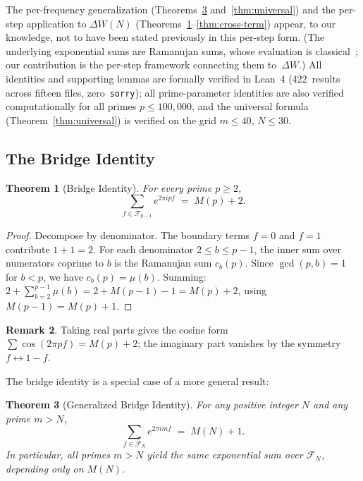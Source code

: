\documentclass[11pt]{article}
\newtheorem{theorem}{Theorem}[section]
\theoremstyle{definition}
\newtheorem{remark}[theorem]{Remark}
\newcommand{\F}{\mathcal{F}}
\begin{document}
The per-frequency generalization (Theorems~\ref{thm:gen-bridge}
and~\ref{thm:universal}) and the per-step application to
$\Delta W(N)$ (Theorems~\ref{thm:bridge}--\ref{thm:cross-term})
appear, to our knowledge, not to have been stated previously
in this per-step form.  (The underlying exponential sums are
Ramanujan sums, whose evaluation is classical~\cite{Ramanujan1918};
our contribution is the per-step framework connecting them
to~$\Delta W$.)  All identities and supporting lemmas are
formally verified in Lean~4 (422~results across fifteen files,
zero~\texttt{sorry}); all prime-parameter identities
are also verified
computationally for all primes $p \le 100{,}000$, and the universal
formula (Theorem~\ref{thm:universal}) is verified on the grid
$m \le 40$, $N \le 30$.

\subsection{The Bridge Identity}

\begin{theorem}[Bridge Identity]\label{thm:bridge}
For every prime $p \ge 2$,
\begin{equation}
  \sum_{f \in \F_{p-1}} e^{2\pi i p f}
  \;=\; M(p) + 2.
\end{equation}
\end{theorem}

\begin{proof}
Decompose by denominator.  The boundary terms $f = 0$ and $f = 1$
contribute $1 + 1 = 2$.  For each denominator $2 \le b \le p-1$,
the inner sum over numerators coprime to $b$ is the Ramanujan sum
$c_b(p)$.  Since $\gcd(p, b) = 1$ for $b < p$, we have
$c_b(p) = \mu(b)$.  Summing: $2 + \sum_{b=2}^{p-1} \mu(b) =
2 + M(p-1) - 1 = M(p) + 2$, using $M(p-1) = M(p) + 1$.
\end{proof}

\begin{remark}
Taking real parts gives the cosine form
$\sum \cos(2\pi pf) = M(p) + 2$;
the imaginary part vanishes by the symmetry $f \leftrightarrow 1 - f$.
\end{remark}

The bridge identity is a special case of a more general result:

\begin{theorem}[Generalized Bridge Identity]\label{thm:gen-bridge}
For any positive integer $N$ and any prime $m > N$,
\begin{equation}
  \sum_{f \in \F_N} e^{2\pi i m f} \;=\; M(N) + 1.
\end{equation}
In particular, all primes $m > N$ yield the \emph{same}
exponential sum over $\F_N$, depending only on $M(N)$.
\end{theorem}
\end{document}
